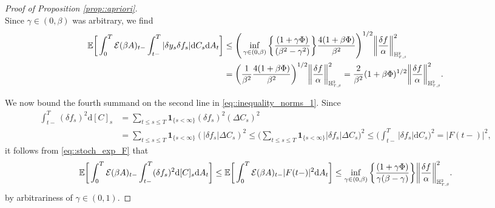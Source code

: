 \documentclass[10pt]{article} %
\newcommand\cE{\mathcal E}
\newcommand{\smalltext}[1]{\text{\fontsize{4}{4}\selectfont$#1$}}
\def \E{\mathbb{E}}
\def \H{\mathbb{H}}
\newcommand{\1}{\mathbf{1}}
\def\d{\mathrm{d}}
\begin{document}
\begin{proof}[Proof of Proposition \ref{prop::apriori}]
\begin{equation*}
\end{equation*}
Since $\gamma \in (0,\beta)$ was arbitrary, we find
\begin{align}\label{eq9}
	\E\bigg[ \int_0^T \cE(\beta A)_{t-}\int_{t-}^T |\delta y_s \delta f_s|\d C_s \d A_t \bigg] 
	&\leq \Bigg( \inf_{\gamma \in (0,\beta)}\bigg\{\frac{(1+\gamma\Phi)}{(\beta^2-\gamma^2)}\bigg\} \frac{4(1+\beta\Phi)}{\beta^2}\Bigg)^{1/2}\bigg\|\frac{\delta f}{\alpha} \bigg\|^2_{\H^\smalltext{2}_{\smalltext{T}\smalltext{,}\smalltext{\beta}}} \nonumber\\
	&= \bigg(\frac{1}{\beta^2} \frac{4(1+\beta\Phi)}{\beta^2}\bigg)^{1/2}\bigg\|\frac{\delta f}{\alpha} \bigg\|^2_{\H^\smalltext{2}_{\smalltext{T}\smalltext{,}\smalltext{\beta}}} = \frac{2}{\beta^2}(1+\beta\Phi)^{1/2}\bigg\|\frac{\delta f}{\alpha} \bigg\|^2_{\H^\smalltext{2}_{\smalltext{T}\smalltext{,}\smalltext{\beta}}}.
\end{align}

\medskip
We now bound the fourth summand on the second line in \eqref{eq::inequality_norms_1}. Since
\begin{align*}
	\int_{t-}^T(\delta f_s)^2\d[C]_s 
	&= \sum_{t \leq s \leq T}\mathbf{1}_{\{s < \infty\}}(\delta f_s)^2 (\Delta C_s)^2 \nonumber\\
	&= \sum_{t \leq s \leq T}\mathbf{1}_{\{s < \infty\}}(|\delta f_s|\Delta C_s)^2 
	\leq \bigg(\sum_{t \leq s \leq T}\mathbf{1}_{\{s < \infty\}}|\delta f_s|\Delta C_s\bigg)^2 
	\leq \bigg(\int_{t-}^T|\delta f_s|\d C_s\bigg)^2 = |F(t-)|^2,
\end{align*}
it follows from \eqref{eq::stoch_exp_F} that
\begin{equation}\label{eq10}
	\E \bigg[ \int_0^T \cE(\beta A)_{t-}\int_{t-}^T(\delta f_s)^2\d[C]_s \d A_t \bigg] 
	\leq \E \bigg[ \int_0^T \cE(\beta A)_{t-}|F(t-)|^2 \d A_t \bigg]
	\leq \inf_{\gamma \in (0,\beta)}\bigg\{\frac{(1+\gamma\Phi)}{\gamma(\beta-\gamma)}\bigg\} \bigg\|\frac{\delta f}{\alpha}\bigg\|^2_{\H^\smalltext{2}_{\smalltext{T}\smalltext{,}\smalltext{\beta}}}.
\end{equation}
by arbitrariness of $\gamma \in (0,1)$.


\end{proof}
\end{document}

